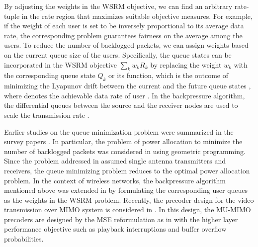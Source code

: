 By adjusting the weights in the \ac{WSRM} objective, we can find an arbitrary rate-tuple in the rate region that maximizes suitable objective measures. For example, if the weight of each user is set to be inversely proportional to its average data rate, the corresponding problem guarantees fairness on the average among the users. To reduce the number of backlogged packets, we can assign weights based on the current queue size of the users. Specifically, the queue states can be incorporated in the \ac{WSRM} objective $\sum_k w_k R_k$ by replacing the weight $w_k$ with the corresponding queue state $Q_k$ or its function, which is the outcome of minimizing the Lyapunov drift between the current and the future queue states \cite{tassiulas,neely2010stochastic}, where  denotes the achievable data rate of user . In the backpressure algorithm, the differential queues between the source and the receiver nodes are used to scale the transmission rate \cite{georgiadis2006resource}.

Earlier studies on the queue minimization problem were summarized in the survey papers \cite{berry2004cross,layering_as_opt}. In particular, the problem of power allocation to minimize the number of backlogged packets was considered in \cite{qps_cioffi} using geometric programming. Since the problem addressed in \cite{qps_cioffi} assumed single antenna transmitters and receivers, the queue minimizing problem reduces to the optimal power allocation problem. In the context of wireless networks, the backpressure algorithm mentioned above was extended in \cite{weeraddana2011resource} by formulating the corresponding user queues as the weights in the \ac{WSRM} problem. Recently, the precoder design for the video transmission over \ac{MIMO} system is considered in \cite{video_queues}. In this design, the \ac{MU}-\ac{MIMO} precoders are designed by the \ac{MSE} reformulation as in \cite{christensen2008weighted} with the higher layer performance objective such as playback interruptions and buffer overflow probabilities.

